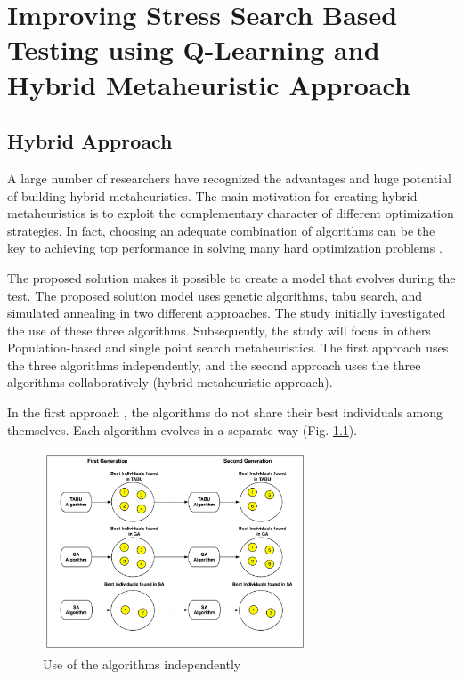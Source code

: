 \chapter{Improving Stress Search Based Testing using Q-Learning and Hybrid Metaheuristic Approach}


\section{Hybrid Approach}

A large number of researchers have recognized the advantages and huge potential of building hybrid metaheuristics. The main motivation for creating hybrid metaheuristics is to exploit the complementary character of different optimization strategies. In fact, choosing an adequate combination of algorithms can be the key to achieving top performance in solving many hard optimization problems \cite{Puchinger2005} \cite{Blum2012}.

The proposed solution makes it possible to create a model that evolves during the test. The proposed solution model uses genetic algorithms, tabu search, and simulated annealing in two different approaches. The study initially investigated the use of these three algorithms. Subsequently, the study will focus in others Population-based and single point search metaheuristics. The first approach uses the three algorithms independently, and the second approach uses the three algorithms collaboratively (hybrid metaheuristic approach).

In the first approach , the algorithms do not share their best individuals among themselves. Each algorithm evolves in a separate way (Fig. \ref{fig:firstaproach}).


\begin{figure}[h]
\centering
\includegraphics[width=0.7\textwidth]{./images/independ.png}
\caption{Use of the algorithms independently}
\label{fig:firstaproach}
\end{figure}



